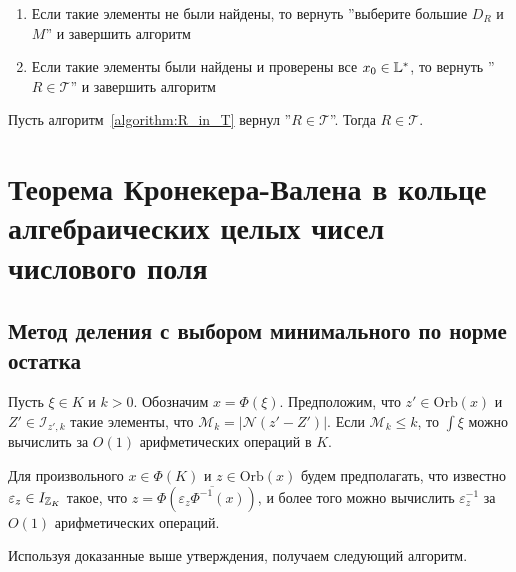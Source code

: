 \documentclass[_00_autoref.tex]{subfiles}
\begin{document}
\begin{algorithm}
\begin{enumerate}
\begin{enumerate}
            \item Если такие элементы не были найдены, то вернуть ''выберите большие $D_R$ и $M$'' и завершить алгоритм
            
            \item Если такие элементы были найдены и проверены все $x_0 \in \mathbb{L}^{*}$, то вернуть ''$R \in \mathcal{T}$'' и завершить алгоритм
        \end{enumerate}
    \end{enumerate}
\end{algorithm}

\begin{lemma}
    Пусть алгоритм~\ref{algorithm:R_in_T} вернул ''$R \in \mathcal{T}$''.
    Тогда $R \in \mathcal{T}$.
\end{lemma}

\section{Теорема Кронекера-Валена в кольце алгебраических целых чисел числового поля}

\subsection{Метод деления с выбором минимального по норме остатка}

\begin{lemma}
    Пусть $\xi \in K$ и $k > 0$.
    Обозначим $x = \Phi(\xi)$.
    Предположим, что $z' \in \textrm{Orb}(x)$ и $Z'\in\mathcal{I}_{z', k}$ такие элементы, что $\mathcal{M}_k = |\mathcal{N}(z'-Z')|$.
    Если $\mathcal{M}_k \le k$, то $\int{\xi}$ можно вычислить за $O(1)$ арифметических операций в $K$.
\end{lemma}

\begin{remark}
    Для произвольного $x \in \Phi(K)$ и $z \in \textrm{Orb}(x)$ будем предполагать, что известно $\varepsilon_z \in I_{\mathbb{Z}_K}$ такое, что $z = \Phi(\overline{\varepsilon_z \Phi^{-1}(x)})$, и более того можно вычислить $\varepsilon_z^{-1}$ за $O(1)$ арифметических операций.
\end{remark}

Используя доказанные выше утверждения, получаем следующий алгоритм.
\end{document}
